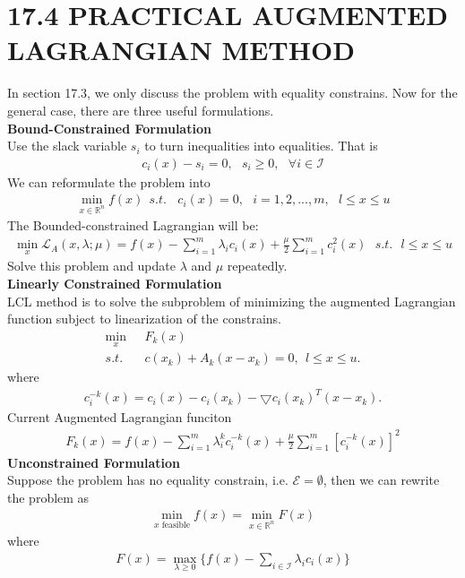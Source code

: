\documentclass[11pt,a4paper]{article}
\renewcommand{\(}{\left(}
\renewcommand{\)}{\right)}
\begin{document}
\section*{17.4 PRACTICAL AUGMENTED LAGRANGIAN METHOD}
In section 17.3, we only discuss the problem with equality constrains. Now for the general case, there are three useful formulations.\\
\textbf{Bound-Constrained Formulation}\\
Use the slack variable $s_{i}$ to turn inequalities into equalities. That is
\begin{align*}
c_{i}(x)-s_{i}=0,~~~s_{i}\geq0,~~~ \forall i\in \mathcal{I}
\end{align*}
We can reformulate the problem into
\begin{align*}
\min_{x\in\mathbb{R}^{n}}f(x)~~s.t.~~~~c_{i}(x)=0,~~~i=1,2,...,m,~~~l\leq x\leq u
\end{align*}
The Bounded-constrained Lagrangian will be:
\begin{align*}
\min_{x}\mathcal{L}_{A}(x,\lambda;\mu)=f(x)-\sum_{i=1}^{m}\lambda_{i}c_{i}(x)+\frac{\mu}{2}\sum_{i=1}^{m}c_{i}^{2}(x)~~~s.t.~~~ l\leq x\leq u
\end{align*}
Solve this problem and update $\lambda$ and $\mu$ repeatedly.\\
\textbf{Linearly Constrained Formulation}\\
LCL method is to solve the subproblem of minimizing the augmented Lagrangian function subject to linearization of the constrains.
\begin{align*}
\min_{x}~~~&F_{k}(x)\\
s.t.~~~&c(x_{k})+A_{k}(x-x_{k})=0,~~l\leq x\leq u. 
\end{align*}
where
\begin{align*}
c_{i}^{-k}(x)=c_{i}(x)-c_{i}(x_{k})-\bigtriangledown c_{i}(x_{k})^{T}(x-x_{k}).
\end{align*}
Current Augmented Lagrangian funciton
\begin{align*}
F_{k}(x)=f(x)-\sum_{i=1}^{m}\lambda^{k}_{i}c^{-k}_{i}(x)+\frac{\mu}{2}\sum_{i=1}^{m}[c^{-k}_{i}(x)]^{2}
\end{align*}
\textbf{Unconstrained Formulation}\\
Suppose the problem has no equality constrain, i.e. $\mathcal{E}=\emptyset$, then we can rewrite the problem as
\begin{align*}
\min_{x \text{ feasible}}f(x) = \min_{x\in \mathbb{R}^{n}}F(x)
\end{align*}
where
\begin{align*}
F(x)=\max_{\lambda\geq0}\lbrace f(x)-\sum_{i\in \mathcal{I}}\lambda_{i}c_{i}(x)\rbrace
\end{align*}
\end{document}
